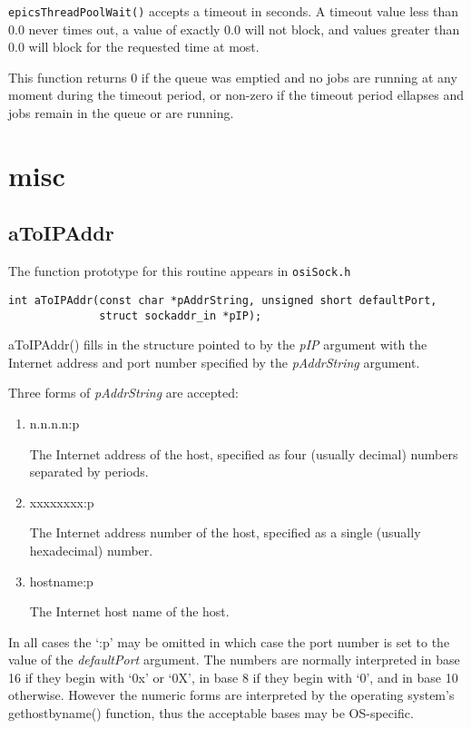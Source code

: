 \verb|epicsThreadPoolWait()| accepts a timeout in seconds. A timeout value
less than 0.0 never times out, a value of exactly 0.0 will not block,
and values greater than 0.0 will block for the requested time at most.

This function returns 0 if the queue was emptied and no jobs are running at any moment during the timeout period,
or non-zero if the timeout period ellapses and jobs remain in the queue or are running.

\section{misc}

\subsection{aToIPAddr}

The function prototype for this routine appears in \verb|osiSock.h|

\begin{verbatim}
int aToIPAddr(const char *pAddrString, unsigned short defaultPort,
              struct sockaddr_in *pIP);
\end{verbatim}

aToIPAddr() fills in the structure pointed to by the \emph{pIP} argument with the Internet address and port number specified by the \emph{pAddrString} argument.

Three forms of \emph{pAddrString} are accepted:

\begin{enumerate}
\item n.n.n.n:p

The Internet address of the host, specified as four (usually decimal) numbers separated by periods.

\item xxxxxxxx:p

The Internet address number of the host, specified as a single (usually hexadecimal) number.

\item hostname:p

The Internet host name of the host.

\end{enumerate}

In all cases the `:p' may be omitted in which case the port number is set to the value of the \emph{defaultPort} argument.
The numbers are normally interpreted in base 16 if they begin with `0x' or `0X', in base 8 if they begin with `0', and in base 10 otherwise.
However the numeric forms are interpreted by the operating system's gethostbyname() function, thus the acceptable bases may be OS-specific.

